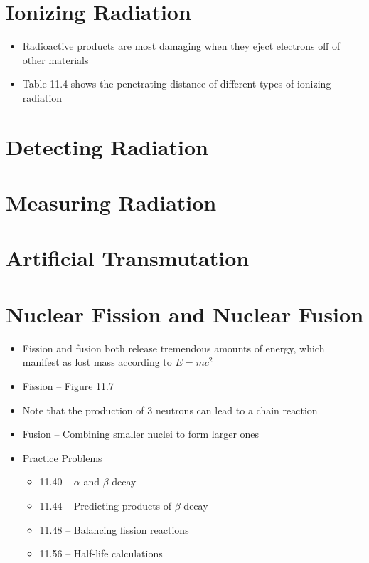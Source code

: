 \documentclass[12pt, openany, letterpaper]{memoir}
\begin{document}
\section{Ionizing Radiation}
\begin{itemize}
	\item Radioactive products are most damaging when they eject electrons off of other materials
	\item Table 11.4 shows the penetrating distance of different types of ionizing radiation
\end{itemize}
\section{Detecting Radiation}
\section{Measuring Radiation}
\section{Artificial Transmutation}
\section{Nuclear Fission and Nuclear Fusion}
\begin{itemize}
	\item Fission and fusion both release tremendous amounts of energy, which manifest as lost mass according to $E=mc^2$
	\item Fission -- Figure 11.7
	
	\item Note that the production of 3 neutrons can lead to a chain reaction
	\item Fusion -- Combining smaller nuclei to form larger ones
	
	
	
	\item Practice Problems
	\begin{itemize}
		\item 11.40 -- $\alpha$ and $\beta$ decay
		\item 11.44 -- Predicting products of $\beta$ decay
		\item 11.48 -- Balancing fission reactions
		\item 11.56 -- Half-life calculations
	\end{itemize}
\end{itemize}
\end{document}
